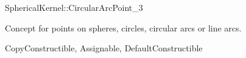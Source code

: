\begin{ccRefConcept}{SphericalKernel::CircularArcPoint_3}

\ccDefinition

Concept for points on spheres, circles, circular arcs or line arcs. 

\ccRefines
CopyConstructible, Assignable, DefaultConstructible

\ccHasModels
{}

\end{ccRefConcept}

